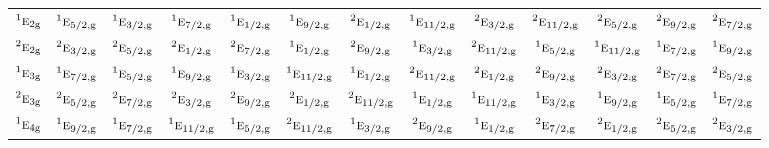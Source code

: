 \documentclass[10pt,a4paper]{article}
\numberwithin{equation}{section}
\newcommand{\irr}[1]{\text{\normalfont\scshape #1}}
\newcommand{\conjpair}[1]{{}^{#1}}
\newcommand{\ptag}[1]{\mathrm{#1}}
\begin{document}
{\begin{longtable}{@{}lcccccccccccc@{}}
$\conjpair{1}\irr{e}_{2\ptag{g}}$ & $\conjpair{1}\irr{e}_{5/2,\ptag{g}}$ & $\conjpair{1}\irr{e}_{3/2,\ptag{g}}$ & $\conjpair{1}\irr{e}_{7/2,\ptag{g}}$ & $\conjpair{1}\irr{e}_{1/2,\ptag{g}}$ & $\conjpair{1}\irr{e}_{9/2,\ptag{g}}$ & $\conjpair{2}\irr{e}_{1/2,\ptag{g}}$ & $\conjpair{1}\irr{e}_{11/2,\ptag{g}}$ & $\conjpair{2}\irr{e}_{3/2,\ptag{g}}$ & $\conjpair{2}\irr{e}_{11/2,\ptag{g}}$ & $\conjpair{2}\irr{e}_{5/2,\ptag{g}}$ & $\conjpair{2}\irr{e}_{9/2,\ptag{g}}$ & $\conjpair{2}\irr{e}_{7/2,\ptag{g}}$\\
$\conjpair{2}\irr{e}_{2\ptag{g}}$ & $\conjpair{2}\irr{e}_{3/2,\ptag{g}}$ & $\conjpair{2}\irr{e}_{5/2,\ptag{g}}$ & $\conjpair{2}\irr{e}_{1/2,\ptag{g}}$ & $\conjpair{2}\irr{e}_{7/2,\ptag{g}}$ & $\conjpair{1}\irr{e}_{1/2,\ptag{g}}$ & $\conjpair{2}\irr{e}_{9/2,\ptag{g}}$ & $\conjpair{1}\irr{e}_{3/2,\ptag{g}}$ & $\conjpair{2}\irr{e}_{11/2,\ptag{g}}$ & $\conjpair{1}\irr{e}_{5/2,\ptag{g}}$ & $\conjpair{1}\irr{e}_{11/2,\ptag{g}}$ & $\conjpair{1}\irr{e}_{7/2,\ptag{g}}$ & $\conjpair{1}\irr{e}_{9/2,\ptag{g}}$\\
$\conjpair{1}\irr{e}_{3\ptag{g}}$ & $\conjpair{1}\irr{e}_{7/2,\ptag{g}}$ & $\conjpair{1}\irr{e}_{5/2,\ptag{g}}$ & $\conjpair{1}\irr{e}_{9/2,\ptag{g}}$ & $\conjpair{1}\irr{e}_{3/2,\ptag{g}}$ & $\conjpair{1}\irr{e}_{11/2,\ptag{g}}$ & $\conjpair{1}\irr{e}_{1/2,\ptag{g}}$ & $\conjpair{2}\irr{e}_{11/2,\ptag{g}}$ & $\conjpair{2}\irr{e}_{1/2,\ptag{g}}$ & $\conjpair{2}\irr{e}_{9/2,\ptag{g}}$ & $\conjpair{2}\irr{e}_{3/2,\ptag{g}}$ & $\conjpair{2}\irr{e}_{7/2,\ptag{g}}$ & $\conjpair{2}\irr{e}_{5/2,\ptag{g}}$\\
$\conjpair{2}\irr{e}_{3\ptag{g}}$ & $\conjpair{2}\irr{e}_{5/2,\ptag{g}}$ & $\conjpair{2}\irr{e}_{7/2,\ptag{g}}$ & $\conjpair{2}\irr{e}_{3/2,\ptag{g}}$ & $\conjpair{2}\irr{e}_{9/2,\ptag{g}}$ & $\conjpair{2}\irr{e}_{1/2,\ptag{g}}$ & $\conjpair{2}\irr{e}_{11/2,\ptag{g}}$ & $\conjpair{1}\irr{e}_{1/2,\ptag{g}}$ & $\conjpair{1}\irr{e}_{11/2,\ptag{g}}$ & $\conjpair{1}\irr{e}_{3/2,\ptag{g}}$ & $\conjpair{1}\irr{e}_{9/2,\ptag{g}}$ & $\conjpair{1}\irr{e}_{5/2,\ptag{g}}$ & $\conjpair{1}\irr{e}_{7/2,\ptag{g}}$\\
$\conjpair{1}\irr{e}_{4\ptag{g}}$ & $\conjpair{1}\irr{e}_{9/2,\ptag{g}}$ & $\conjpair{1}\irr{e}_{7/2,\ptag{g}}$ & $\conjpair{1}\irr{e}_{11/2,\ptag{g}}$ & $\conjpair{1}\irr{e}_{5/2,\ptag{g}}$ & $\conjpair{2}\irr{e}_{11/2,\ptag{g}}$ & $\conjpair{1}\irr{e}_{3/2,\ptag{g}}$ & $\conjpair{2}\irr{e}_{9/2,\ptag{g}}$ & $\conjpair{1}\irr{e}_{1/2,\ptag{g}}$ & $\conjpair{2}\irr{e}_{7/2,\ptag{g}}$ & $\conjpair{2}\irr{e}_{1/2,\ptag{g}}$ & $\conjpair{2}\irr{e}_{5/2,\ptag{g}}$ & $\conjpair{2}\irr{e}_{3/2,\ptag{g}}$\\

\end{longtable}}
\end{document}
